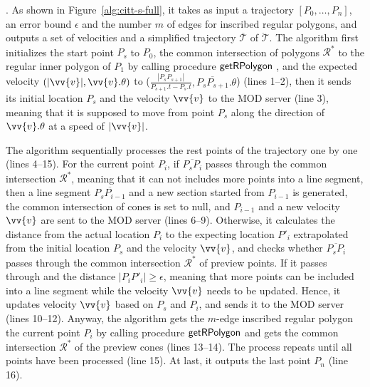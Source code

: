 .
As shown in Figure~\ref{alg:citt-s-full}, it takes as input a trajectory ${[P_0, \ldots, P_n]}$, an error bound $\epsilon$ and the number $m$ of edges for inscribed regular polygons, and outputs a set of velocities and a simplified  trajectory $\overline{\mathcal{T}}$ of $\dddot{\mathcal{T}}$.
%
The algorithm first initializes the start point $P_s$ to $P_0$, the common intersection of polygons $\mathcal{R}^*$ to the regular inner polygon of $P_1$ by calling procedure ${\mathsf{getRPolygon}}$ \cite{Lin:Cised}, and the expected velocity $(|\vv{v}|, \vv{v}.\theta)$ to ($\frac{|P_{s}P_{s+1}|}{P_{s+1}.t-P_s.t},\overline{P_{s}P_{s+1}}.\theta$) (lines 1--2), then it sends its initial location $P_s$ and the velocity $\vv{v}$ to the MOD server (line 3), meaning that it is supposed to move from point $P_s$ along the direction of $\vv{v}.\theta$ at a speed of $|\vv{v}|$.

The algorithm sequentially processes the rest points of the trajectory one by one (lines 4--15). 
For the current point $P_{i}$, if $\overline{P_sP_{i}}$ passes through the common intersection $\mathcal{R}^*$, meaning that it can not includes more points into a line segment, then a line segment $\overline{P_sP_{i-1}}$ and a new section started from  $P_{i-1}$ is generated, the common intersection of cones is set to null, and $P_{i-1}$ and a new velocity $\vv{v}$ are sent to the MOD server (lines 6--9).
%
Otherwise, it calculates the distance from the actual location $P_{i}$ to the expecting location $P'_{i}$ extrapolated from the initial location $P_s$ and the velocity $\vv{v}$, and checks whether $\overline{P_sP_{i}}$ passes through the common intersection $\mathcal{R}^*$ of preview points.
If it passes through and the distance $|P_{i}P'_{i}| \ge \epsilon$, meaning that more points can be included into a line segment while the velocity $\vv{v}$ needs to be updated. Hence, it updates velocity $\vv{v}$ based on $P_s$ and $P_{i}$, and sends it to the MOD server (lines 10--12). 
%
Anyway, the algorithm gets the $m$-edge inscribed regular polygon \wrt the current point $P_{i}$ by calling procedure ${\mathsf{getRPolygon}}$ \cite{Lin:Cised} and gets the common intersection $\mathcal{R}^*$ of the preview cones (lines 13--14). The process repeats until all points have been processed (line 15).
At last, it outputs the last point $P_{n}$ (line 16).




